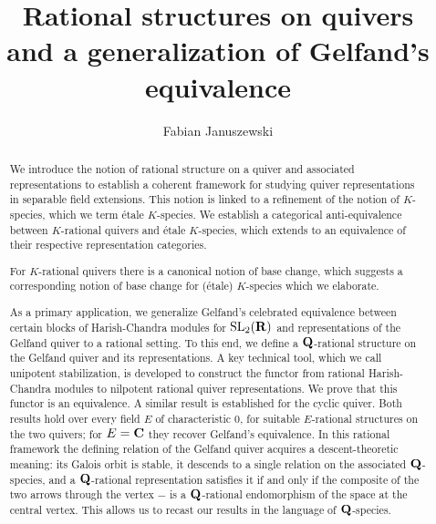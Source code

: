 \documentclass[a4paper,12pt,reqno]{amsart}
\newcommand{\CC}{{\rm\bf C}}
\newcommand{\RR}{{\rm\bf R}}
\newcommand{\QQ}{{\rm\bf Q}}
\theoremstyle{plain}
\theoremstyle{remark}
\begin{document}
    \title{Rational structures on quivers\\and a generalization of Gelfand's equivalence}

    \author{Fabian Januszewski}
    \address{Institut f\"ur Mathematik, Fakult\"at EIM, Paderborn University, Warburger Str.\ 100, 33098 Paderborn, Germany}

    \begin{abstract}
      We introduce the notion of rational structure on a quiver and associated representations to establish a coherent framework for studying quiver representations in separable field extensions. This notion is linked to a refinement of the notion of $K$-species, which we term \'etale $K$-species. We establish a categorical anti-equivalence between $K$-rational quivers and \'etale $K$-species, which extends to an equivalence of their respective representation categories.

      For $K$-rational quivers there is a canonical notion of base change, which suggests a corresponding notion of base change for (\'etale) $K$-species which we elaborate.

      As a primary application, we generalize Gelfand's celebrated equivalence between certain blocks of Harish-Chandra modules for $\mathrm{SL}_2(\RR)$ and representations of the Gelfand quiver to a rational setting. To this end, we define a $\QQ$-rational structure on the Gelfand quiver and its representations. A key technical tool, which we call unipotent stabilization, is developed to construct the functor from rational Harish-Chandra modules to nilpotent rational quiver representations. We prove that this functor is an equivalence. A similar result is established for the cyclic quiver. Both results hold over every field $E$ of characteristic $0$, for suitable $E$-rational structures on the two quivers; for $E=\CC$ they recover Gelfand's equivalence. In this rational framework the defining relation of the Gelfand quiver acquires a descent-theoretic meaning: its Galois orbit is stable, it descends to a single relation on the associated $\QQ$-species, and a $\QQ$-rational representation satisfies it if and only if the composite of the two arrows through the vertex $-$ is a $\QQ$-rational endomorphism of the space at the central vertex. This allows us to recast our results in the language of $\QQ$-species.
    \end{abstract}

    \maketitle
\end{document}
